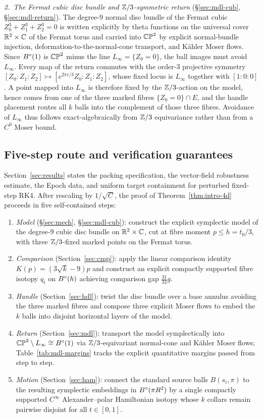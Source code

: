 \emph{2.\ The Fermat cubic disc bundle and $\mathbb{Z}/3$-symmetric return} (\S\ref{sec:mdl-cub}, \S\ref{sec:mdl-return}). The
degree-$9$ normal disc bundle of the Fermat cubic $Z_0^3+Z_1^3+Z_2^3=0$ is written explicitly by theta functions on the
universal cover $\mathbb{R}^2\times\mathbb{C}$ of the Fermat torus and carried into $\mathbb{CP}^2$ by explicit normal-bundle injection,
deformation-to-the-normal-cone transport, and K\"ahler Moser flows. Since $B^{\circ}(1)$ is $\mathbb{CP}^2$ minus the line
$L_\infty=\{Z_0=0\}$, the ball images must avoid $L_\infty$. Every map of the return commutes with the order-$3$
projective symmetry $[Z_0:Z_1:Z_2]\mapsto[e^{2\pi i/3}Z_0:Z_1:Z_2]$, whose fixed locus is $L_\infty$ together with
$[1:0:0]$. A point mapped into $L_\infty$ is therefore fixed by the $\mathbb{Z}/3$-action on the model, hence comes from one of
the three marked fibres $\{Z_0=0\}\cap E$, and the handle placement routes all $k$ balls into the complement of those
three fibres. Avoidance of $L_\infty$ thus follows exact-algebraically from $\mathbb{Z}/3$ equivariance rather than from a $C^0$
Moser bound.

\subsection{Five-step route and verification guarantees}\label{sec:intro-organisation}

Section~\ref{sec:results} states the packing specification, the vector-field robustness estimate, the Epoch data, and
uniform target containment for perturbed fixed-step RK4. After rescaling by $1/\sqrt C$, the proof of
Theorem~\ref{thm:intro-4d} proceeds in five self-contained steps:
\begin{enumerate}[label=(\arabic*),leftmargin=2em]
\item \emph{Model} (\S\ref{sec:mech}, \S\ref{sec:mdl-cub}): construct the explicit symplectic model of the degree-$9$
cubic disc bundle on $\mathbb{R}^2\times\mathbb{C}$, cut at fibre moment $p\le h=t_0/3$, with three $\mathbb{Z}/3$-fixed marked points on the
Fermat torus.
\item \emph{Comparison} (Section~\ref{sec:cmp}): apply the linear comparison identity $K(p)=(3\sqrt k-9)p$ and construct
an explicit compactly supported fibre isotopy $q_t$ on $B^{\circ}(h)$ achieving comparison gap $\frac{31}{32}g$.
\item \emph{Handle} (Section~\ref{sec:hdl}): twist the disc bundle over a base annulus avoiding the three marked fibres
and compose three explicit Moser flows to embed the $k$ balls into disjoint horizontal layers of the model.
\item \emph{Return} (Section~\ref{sec:mdl}): transport the model symplectically into $\mathbb{CP}^2\setminus L_\infty\cong B^{\circ}(1)$
via $\mathbb{Z}/3$-equivariant normal-cone and K\"ahler Moser flows; Table~\ref{tab:mdl-margins} tracks the explicit quantitative
margins passed from step to step.
\item \emph{Motion} (Section~\ref{sec:ham}): connect the standard source balls $B(s_i,\pi)$ to the resulting symplectic
embeddings in $B^{\circ}(\pi R^2)$ by a single compactly supported $C^\infty$ Alexander--polar Hamiltonian isotopy whose $k$
collars remain pairwise disjoint for all $t\in[0,1]$.
\end{enumerate}

